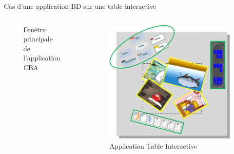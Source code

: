 \documentclass[11pt]{beamer}
\begin{document}
\begin{frame}{Cas d'une application BD sur une table interactive }
\begin{columns}
\begin{figure}[ht]
\begin{center}
 	\caption{Fen\^{e}tre principale de l'application CBA}
 	\end{center}
 	\end{figure}
 	\pause
	\begin{figure}
\centering
\includegraphics[scale=.3]{./img/applitable}
\caption{Application Table Interactive}
\end{figure}

 \end{columns}

\end{frame}
\end{document}
